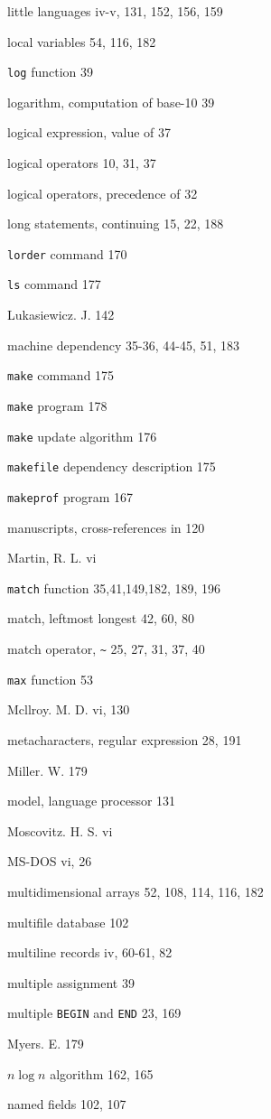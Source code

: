 \begin{multicols}{3}
little languages iv-v, 131, 152, 156, 159

local variables 54, 116, 182

\verb'log' function 39

logarithm, computation of base-10 39

logical expression, value of 37

logical operators 10, 31, 37

logical operators, precedence of 32

long statements, continuing 15, 22, 188

\verb'lorder' command 170

\verb'ls' command 177

Lukasiewicz. J. 142

machine dependency 35-36, 44-45, 51, 183

\verb'make' command 175

\verb'make' program 178

\verb'make' update algorithm 176

\verb'makefile' dependency description 175

\verb'makeprof' program 167

manuscripts, cross-references in 120

Martin, R. L. vi

\verb'match' function 35,41,149,182, 189, 196

match, leftmost longest 42, 60, 80

match operator, \verb'~' 25, 27, 31, 37, 40

\verb'max' function 53

Mcllroy. M. D. vi, 130

metacharacters, regular expression 28, 191

Miller. W. 179

model, language processor 131

Moscovitz. H. S. vi

MS-DOS vi, 26

multidimensional arrays 52, 108, 114, 116, 182

multifile database 102

multiline records iv, 60-61, 82

multiple assignment 39

multiple \verb'BEGIN' and \verb'END' 23, 169

Myers. E. 179

$n \log n$ algorithm 162, 165

named fields 102, 107


\end{multicols}
